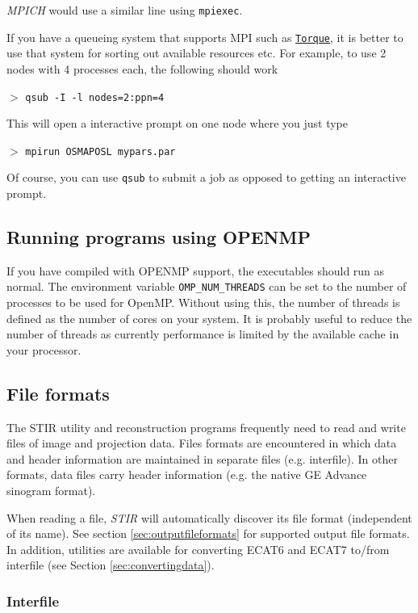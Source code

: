 \documentclass{article}
\def\url#1#2{\mbox{\href{#1}{\tt #2}}}
\newcommand{\cmdline}[1]{\par \noindent $>$ \texttt{#1}\par}
\begin{document}
\textit{MPICH} would use a similar line using \texttt{mpiexec}.

If you have a queueing system that supports MPI such as 
\url{http://www.clusterresources.com/products/torque-resource-manager.php}{Torque}, it is better to use 
that system for sorting out available resources etc. For example, to use 2 nodes with 4 processes each,
the following should work

\cmdline{qsub -I -l nodes=2:ppn=4}

This will open a interactive prompt on one node where you just type

\cmdline{mpirun OSMAPOSL mypars.par}

Of course, you can use \texttt{qsub} to submit a job as opposed to getting an interactive prompt.

\subsection{
Running programs using OPENMP \label{sec:RunningWithOPENMP}}
If you have compiled with OPENMP support, the executables should run as normal.
The environment variable \texttt{OMP\_NUM\_THREADS} can be set to the number of processes to be used for OpenMP. 
Without using this, the number of threads is  defined as the number of cores on your system. It is probably 
useful to reduce the number of threads as currently performance is limited by the available cache in your 
processor.

\subsection{
File formats}
\label{sec:fileformats}
The STIR utility and reconstruction programs frequently need 
to read and write files of image and projection data. Files formats 
are encountered in which data and header information are maintained 
in separate files (e.g. interfile). In other formats, data files 
carry header information (e.g. the native GE Advance sinogram 
format).

When reading a file, \textit{STIR} will automatically discover its file format
(independent of its name). See section \ref{sec:outputfileformats} for supported output file formats. In addition, 
utilities are available for converting ECAT6 and ECAT7 to/from 
interfile (see Section \ref{sec:convertingdata}). 

\subsubsection{Interfile}
\end{document}
